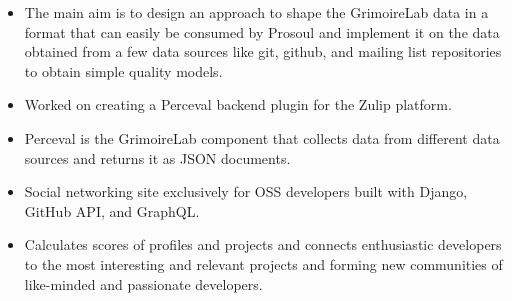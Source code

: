 \documentclass[10pt,a4paper]{style}
\begin{document}
%







\begin{itemize}
  \item The main aim is to design an approach to shape the GrimoireLab data in a format that can easily be consumed by Prosoul and implement it on the data obtained from a few data sources like git, github, and mailing list repositories to obtain simple quality models.
\end{itemize}

\divider

\begin{itemize}
  \item Worked on creating a Perceval backend plugin for the Zulip platform.
  \item Perceval is the GrimoireLab component that collects data from different data sources and returns it as JSON documents.
\end{itemize}

\divider

\begin{itemize}
  \item Social networking site exclusively for OSS developers built with Django, GitHub API, and GraphQL.
  \item Calculates scores of profiles and projects and connects enthusiastic developers to the most interesting and relevant projects and forming new communities of like-minded and passionate developers.
\end{itemize}
\end{document}
